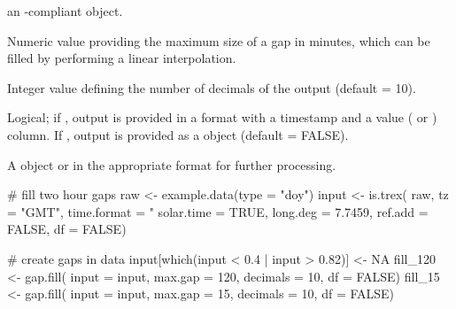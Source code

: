 \documentclass[a4paper]{book}
\begin{document}
%
\begin{Arguments}
\begin{ldescription}
\item[\code{input}] an -compliant object.

\item[\code{max.gap}] Numeric value providing the maximum size of a gap in minutes,
which can be filled by performing a linear interpolation.

\item[\code{decimals}] Integer value defining the number of decimals of the output (default = 10).

\item[\code{df}] Logical; if , output is provided in a 
format with a timestamp and a value ( or ) column.
If , output is provided as a  object (default = FALSE).
\end{ldescription}
\end{Arguments}
%
\begin{Value}
A  object or  in the appropriate format for further processing.
\end{Value}
%
\begin{Examples}
\begin{ExampleCode}
# fill two hour gaps
raw   <- example.data(type = "doy")
input <-
  is.trex(
    raw,
    tz = "GMT",
    time.format = "%
    solar.time = TRUE,
    long.deg = 7.7459,
    ref.add = FALSE,
    df = FALSE)

# create gaps in data
input[which(input < 0.4 | input > 0.82)] <- NA
fill_120 <- gap.fill(
  input = input,
  max.gap = 120,
  decimals = 10,
  df = FALSE)
fill_15 <- gap.fill(
  input = input,
  max.gap = 15,
  decimals = 10,
  df = FALSE)
\end{ExampleCode}
\end{Examples}
%
\end{document}
